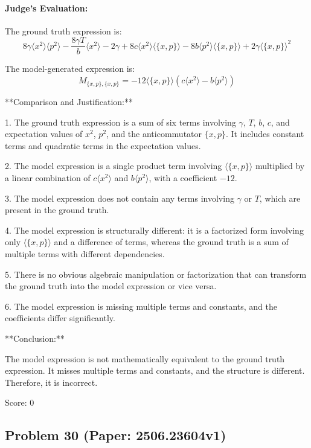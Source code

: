 \documentclass[10pt]{article}
\begin{document}
\paragraph*{Judge's Evaluation:}

The ground truth expression is:
\[
8 \gamma \langle x^2 \rangle \langle p^2 \rangle - \frac{8 \gamma T}{b} \langle x^2 \rangle - 2 \gamma + 8 c \langle x^2 \rangle \langle \{x, p\} \rangle - 8 b \langle p^2 \rangle \langle \{x, p\} \rangle + 2 \gamma \langle \{x, p\} \rangle^2
\]

The model-generated expression is:
\[
M_{\{x,p\},\{x,p\}} = -12 \langle \{x,p\} \rangle \left( c \langle x^2 \rangle - b \langle p^2 \rangle \right)
\]

**Comparison and Justification:**

1. The ground truth expression is a sum of six terms involving $\gamma$, $T$, $b$, $c$, and expectation values of $x^2$, $p^2$, and the anticommutator $\{x,p\}$. It includes constant terms and quadratic terms in the expectation values.

2. The model expression is a single product term involving $\langle \{x,p\} \rangle$ multiplied by a linear combination of $c \langle x^2 \rangle$ and $b \langle p^2 \rangle$, with a coefficient $-12$.

3. The model expression does not contain any terms involving $\gamma$ or $T$, which are present in the ground truth.

4. The model expression is structurally different: it is a factorized form involving only $\langle \{x,p\} \rangle$ and a difference of terms, whereas the ground truth is a sum of multiple terms with different dependencies.

5. There is no obvious algebraic manipulation or factorization that can transform the ground truth into the model expression or vice versa.

6. The model expression is missing multiple terms and constants, and the coefficients differ significantly.

**Conclusion:**

The model expression is not mathematically equivalent to the ground truth expression. It misses multiple terms and constants, and the structure is different. Therefore, it is incorrect.

Score: 0

\newpage
\subsection*{Problem 30 (Paper: 2506.23604v1)}
\end{document}
